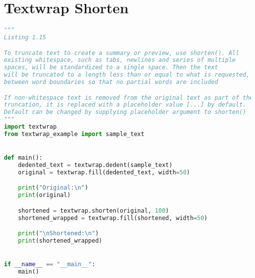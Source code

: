 \documentclass[a4paper,landscape]{report}
\begin{document}
\section{Textwrap Shorten}
\begin{lstlisting}[language=Python]
"""
Listing 1.15

To truncate text to create a summary or preview, use shorten(). All
existing whitespace, such as tabs, newlines and series of multiple
spaces, will be standardized to a single space. Then the text
will be truncated to a length less than or equal to what is requested,
between word boundaries so that no partial words are included

If non-whitespace text is removed from the original text as part of the
truncation, it is replaced with a placeholder value [...] by default.
Default can be changed by supplying placeholder argument to shorten()
"""
import textwrap
from textwrap_example import sample_text


def main():
    dedented_text = textwrap.dedent(sample_text)
    original = textwrap.fill(dedented_text, width=50)

    print("Original:\n")
    print(original)

    shortened = textwrap.shorten(original, 100)
    shortened_wrapped = textwrap.fill(shortened, width=50)

    print("\nShortened:\n")
    print(shortened_wrapped)


if __name__ == "__main__":
    main()

\end{lstlisting}
\end{document}
